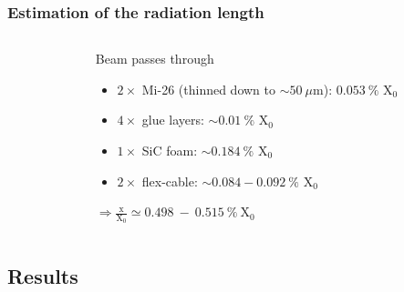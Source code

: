 \documentclass{beamer}
\begin{document}
    \begin{frame}
      \frametitle{Estimation of the radiation length}

      \begin{columns}[t]
        \begin{column}{5cm}
        \end{column}
        \begin{column}{5cm}
          \begin{block}{Beam passes through}
            \begin{itemize}
              \item $2 \times$ Mi-26 (thinned down to $\sim 50~\mu$m): $0.053~\%$ X$_0$
              \item $4 \times$ glue layers: $\sim 0.01~\%$ X$_0$
              \item $1 \times$ SiC foam: $\sim 0.184~\%$ X$_0$
              \item $2 \times$ flex-cable: $\sim 0.084 - 0.092~\%$ X$_0$
            \end{itemize}
            $\Rightarrow \frac{\text{x}}{\text{X}_0} \simeq 0.498~-~0.515~\%~\text{X}_0$
          \end{block}
        \end{column}
      \end{columns}
    \end{frame}

    \subsection{Results}
\end{document}

